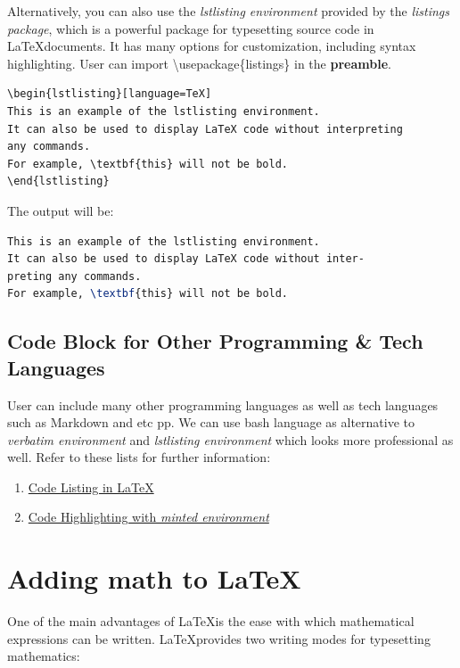 \documentclass[12pt, letterpaper]{article}
\begin{document}
Alternatively, you can also use the \textit{lstlisting environment} provided by the \textit{listings package}, which is a powerful package for typesetting source code in \LaTeX documents. It has many options for customization, including syntax highlighting. User can import \textbackslash usepackage\{listings\} in the \textbf{preamble}.

\begin{verbatim}
\begin{lstlisting}[language=TeX]
This is an example of the lstlisting environment.
It can also be used to display LaTeX code without interpreting
any commands.
For example, \textbf{this} will not be bold.
\end{lstlisting}
\end{verbatim}

The output will be:

\begin{lstlisting}[language=TeX]
This is an example of the lstlisting environment.
It can also be used to display LaTeX code without inter-
preting any commands.
For example, \textbf{this} will not be bold.
\end{lstlisting}

\subsection{Code Block for Other Programming \& Tech Languages}

User can include many other programming languages as well as tech languages such as Markdown and etc pp. We can use bash language as alternative to \textit{verbatim environment} and \textit{lstlisting environment} which looks more professional as well.
Refer to these lists for further information:

\begin{enumerate}
    \item \href{https://www.overleaf.com/learn/latex/Code_listing}{Code Listing in \LaTeX}
    \item \href{https://www.overleaf.com/learn/latex/Code_Highlighting_with_minted}{Code Highlighting with \textit{minted environment}}
\end{enumerate}

\section{Adding math to \LaTeX}

One of the main advantages of \LaTeX is the ease with which mathematical expressions can be written. \LaTeX provides two writing modes for typesetting mathematics:
\end{document}
